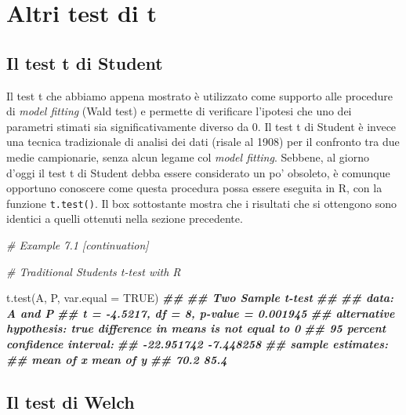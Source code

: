 \documentclass[
  12pt,
]{book}
\newenvironment{Shaded}{\begin{snugshade}}{\end{snugshade}}
\newcommand{\AttributeTok}[1]{\textcolor[rgb]{0.77,0.63,0.00}{#1}}
\newcommand{\CommentTok}[1]{\textcolor[rgb]{0.56,0.35,0.01}{\textit{#1}}}
\newcommand{\ConstantTok}[1]{\textcolor[rgb]{0.00,0.00,0.00}{#1}}
\newcommand{\DocumentationTok}[1]{\textcolor[rgb]{0.56,0.35,0.01}{\textbf{\textit{#1}}}}
\newcommand{\FunctionTok}[1]{\textcolor[rgb]{0.00,0.00,0.00}{#1}}
\newcommand{\NormalTok}[1]{#1}
\begin{document}
\hypertarget{altri-test-di-t}{%
\section{Altri test di t}\label{altri-test-di-t}}

\hypertarget{il-test-t-di-student}{%
\subsection{Il test t di Student}\label{il-test-t-di-student}}

Il test t che abbiamo appena mostrato è utilizzato come supporto alle procedure di \emph{model fitting} (Wald test) e permette di verificare l'ipotesi che uno dei parametri stimati sia significativamente diverso da 0. Il test t di Student è invece una tecnica tradizionale di analisi dei dati (risale al 1908) per il confronto tra due medie campionarie, senza alcun legame col \emph{model fitting}. Sebbene, al giorno d'oggi il test t di Student debba essere considerato un po' obsoleto, è comunque opportuno conoscere come questa procedura possa essere eseguita in R, con la funzione \texttt{t.test()}. Il box sottostante mostra che i risultati che si ottengono sono identici a quelli ottenuti nella sezione precedente.

\vspace{12pt}

\begin{Shaded}
\begin{Highlighting}[]
\CommentTok{\# Example 7.1 [continuation]}

\CommentTok{\# Traditional Student\textquotesingle{}s t{-}test with R}

\FunctionTok{t.test}\NormalTok{(A, P, }\AttributeTok{var.equal =} \ConstantTok{TRUE}\NormalTok{)}
\DocumentationTok{\#\# }
\DocumentationTok{\#\#  Two Sample t{-}test}
\DocumentationTok{\#\# }
\DocumentationTok{\#\# data:  A and P}
\DocumentationTok{\#\# t = {-}4.5217, df = 8, p{-}value = 0.001945}
\DocumentationTok{\#\# alternative hypothesis: true difference in means is not equal to 0}
\DocumentationTok{\#\# 95 percent confidence interval:}
\DocumentationTok{\#\#  {-}22.951742  {-}7.448258}
\DocumentationTok{\#\# sample estimates:}
\DocumentationTok{\#\# mean of x mean of y }
\DocumentationTok{\#\#      70.2      85.4}
\end{Highlighting}
\end{Shaded}

\hypertarget{il-test-di-welch}{%
\subsection{Il test di Welch}\label{il-test-di-welch}}
\end{document}
